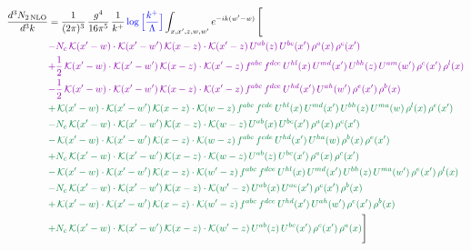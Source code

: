 \documentclass[10pt]{article}
\numberwithin{equation}{section}
\newcommand{\new}[1]{{\color{blue}#1}}
\begin{document}
\begin{align}
\frac{d^{3}N_{2\,\mathrm{NLO}}}{d^{3}k} & = \frac{1}{(2\pi)^{3}}\,\frac{g^{4}}{16\pi^{5}}\,\frac{1}{k^{+}}\,\new{\log\Big[\frac{k^{+}}{\Lambda}\Big]}\int_{x,x',z,w,w'}e^{-ik(w'-w)}\,\Bigg[\notag\\ &{\color{CC} -N_{c}\,\mathcal{K}(x'-w)\cdot\mathcal{K}(x'-w')\,\mathcal{K}(x-z)\cdot\mathcal{K}(x'-z)\,U^{ab}(z)\,U^{bc}(x')\,\rho^{a}(x)\,\rho^{c}(x')} \notag\\
&{\color{CC} +\frac{1}{2}\,\mathcal{K}(x'-w)\cdot\mathcal{K}(x'-w')\,\mathcal{K}(x-z)\cdot\mathcal{K}(x'-z)\,f^{abc}\,f^{dce}\,U^{hl}(x)\,U^{md}(x')\,U^{bh}(z)\,U^{am}(w')\,\rho^{e}(x')\,\rho^{l}(x)} \notag\\
&{\color{CC} -\frac{1}{2}\,\mathcal{K}(x'-w)\cdot\mathcal{K}(x'-w')\,\mathcal{K}(x-z)\cdot\mathcal{K}(x'-z)\,f^{abc}\,f^{dce}\,U^{hd}(x')\,U^{ah}(w')\,\rho^{e}(x')\,\rho^{b}(x)} \notag\\
&{\color{JIM} +\,\mathcal{K}(x'-w)\cdot\mathcal{K}(x'-w')\,\mathcal{K}(x-z)\cdot\mathcal{K}(w-z)\,f^{abc}\,f^{cde}\,U^{hl}(x)\,U^{md}(x')\,U^{bh}(z)\,U^{ma}(w)\,\rho^{l}(x)\,\rho^{e}(x')} \notag\\
&{\color{JIM} -N_{c}\,\mathcal{K}(x'-w)\cdot\mathcal{K}(x'-w')\,\mathcal{K}(x-z)\cdot\mathcal{K}(w-z)\,U^{ab}(x)\,U^{bc}(x')\,\rho^{a}(x)\,\rho^{c}(x')} \notag\\
&{\color{JIM} -\,\mathcal{K}(x'-w)\cdot\mathcal{K}(x'-w')\,\mathcal{K}(x-z)\cdot\mathcal{K}(w-z)\,f^{abc}\,f^{cde}\,U^{hd}(x')\,U^{ha}(w)\,\rho^{b}(x)\,\rho^{e}(x')} \notag\\
&{\color{JIM} +N_{c}\,\mathcal{K}(x'-w)\cdot\mathcal{K}(x'-w')\,\mathcal{K}(x-z)\cdot\mathcal{K}(w-z)\,U^{ab}(z)\,U^{bc}(x')\,\rho^{a}(x)\,\rho^{c}(x')} \notag\\
&{\color{JIM} -\,\mathcal{K}(x'-w)\cdot\mathcal{K}(x'-w')\,\mathcal{K}(x-z)\cdot\mathcal{K}(w'-z)\,f^{abc}\,f^{dce}\,U^{hl}(x)\,U^{md}(x')\,U^{bh}(z)\,U^{ma}(w')\,\rho^{e}(x')\,\rho^{l}(x)} \notag\\
&{\color{JIM} -N_{c}\,\mathcal{K}(x'-w)\cdot\mathcal{K}(x'-w')\,\mathcal{K}(x-z)\cdot\mathcal{K}(w'-z)\,U^{ab}(x)\,U^{ac}(x')\,\rho^{c}(x')\,\rho^{b}(x)} \notag\\
&{\color{JIM} +\,\mathcal{K}(x'-w)\cdot\mathcal{K}(x'-w')\,\mathcal{K}(x-z)\cdot\mathcal{K}(w'-z)\,f^{abc}\,f^{dce}\,U^{hd}(x')\,U^{ah}(w')\,\rho^{e}(x')\,\rho^{b}(x)} \notag\\
&{\color{JIM} +N_{c}\,\mathcal{K}(x'-w)\cdot\mathcal{K}(x'-w')\,\mathcal{K}(x-z)\cdot\mathcal{K}(w'-z)\,U^{ab}(z)\,U^{bc}(x')\,\rho^{c}(x')\,\rho^{a}(x)}\Bigg] \end{align}
\end{document}
